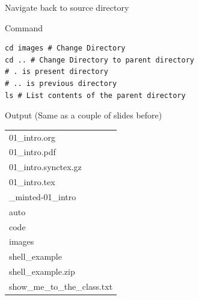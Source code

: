 \documentclass[presentation]{beamer}
\begin{document}
\begin{frame}[label={sec:orgb3bf0e6},fragile]{Navigate back to source directory}
 \begin{block}{Command}
\begin{verbatim}
cd images # Change Directory
cd .. # Change Directory to parent directory
# . is present directory
# .. is previous directory
ls # List contents of the parent directory
\end{verbatim}
\end{block}

\alert{Output} (Same as a couple of slides before)
\scriptsize
\begin{center}
\begin{tabular}{l}
\toprule
01\_intro.org\\
01\_intro.pdf\\
01\_intro.synctex.gz\\
01\_intro.tex\\
\_minted-01\_intro\\
auto\\
code\\
images\\
shell\_example\\
shell\_example.zip\\
show\_me\_to\_the\_class.txt\\
\bottomrule
\end{tabular}
\end{center}
\end{frame}
\end{document}
